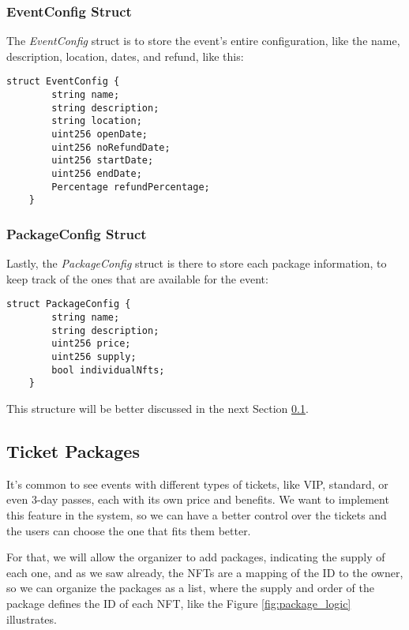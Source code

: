 \subsubsection{EventConfig Struct}
\label{subsubsec:eventconfig_struct}

The \textit{EventConfig} struct is to store the event's entire configuration,
like the name, description, location, dates, and refund, like this:
\begin{lstlisting}[caption=EventConfig struct]
    struct EventConfig {
        string name;
        string description;
        string location;
        uint256 openDate;
        uint256 noRefundDate;
        uint256 startDate;
        uint256 endDate;
        Percentage refundPercentage;
    }
\end{lstlisting}

\subsubsection{PackageConfig Struct}
\label{subsubsec:packageconfig_struct}

Lastly, the \textit{PackageConfig} struct is there to store each package
information, to keep track of the ones that are available for the event:
\begin{lstlisting}[caption=PackageConfig struct]
    struct PackageConfig {
        string name;
        string description;
        uint256 price;
        uint256 supply;
        bool individualNfts;
    }
\end{lstlisting}
This structure will be better discussed in the next Section
\ref{subsec:ticket_packages}.

\subsection{Ticket Packages}
\label{subsec:ticket_packages}

It's common to see events with different types of tickets, like VIP, standard,
or even 3-day passes, each with its own price and benefits. We want to
implement this feature in the system, so we can have a better control over the
tickets and the users can choose the one that fits them better.

For that, we will allow the organizer to add packages, indicating the supply of
each one, and as we saw already, the NFTs are a mapping of the ID to the owner,
so we can organize the packages as a list, where the supply and order of the
package defines the ID of each NFT, like the Figure \ref{fig:package_logic}
illustrates.

